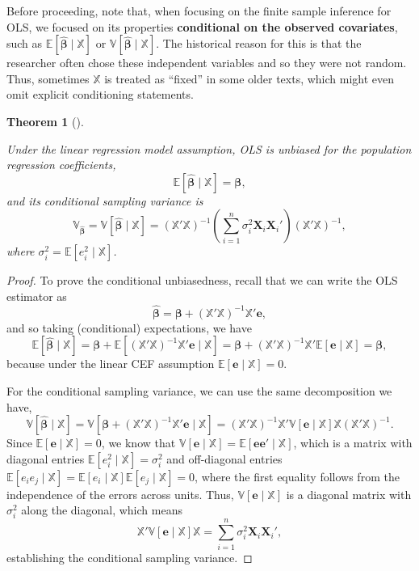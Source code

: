 \documentclass[
  13pt,
  letterpaper,
  DIV=11,
  numbers=noendperiod]{scrreprt}
\newcommand{\mb}{\bm}
\newcommand{\E}{\mathbb{E}}
\newcommand{\V}{\mathbb{V}}
\newcommand{\X}{\mb{X}}
\newcommand{\Xmat}{\mathbb{X}}
\newcommand{\bfbeta}{\mb{\beta}}
\newcommand{\bhat}{\widehat{\mb{\beta}}}
\theoremstyle{plain}
\newtheorem{theorem}{Theorem}[chapter]
\theoremstyle{plain}
\theoremstyle{definition}
\theoremstyle{definition}
\theoremstyle{remark}
\begin{document}
Before proceeding, note that, when focusing on the finite sample
inference for OLS, we focused on its properties \textbf{conditional on
the observed covariates}, such as \(\E[\bhat \mid \Xmat]\) or
\(\V[\bhat \mid \Xmat]\). The historical reason for this is that the
researcher often chose these independent variables and so they were not
random. Thus, sometimes \(\Xmat\) is treated as ``fixed'' in some older
texts, which might even omit explicit conditioning statements.

\begin{theorem}[]\protect\hypertarget{thm-ols-unbiased}{}\label{thm-ols-unbiased}

Under the linear regression model assumption, OLS is unbiased for the
population regression coefficients, \[
\E[\bhat \mid \Xmat] = \bfbeta,
\] and its conditional sampling variance is \[
\mb{\V}_{\bhat} = \V[\bhat \mid \Xmat] = \left( \Xmat'\Xmat \right)^{-1}\left( \sum_{i=1}^n \sigma^2_i \X_i\X_i' \right) \left( \Xmat'\Xmat \right)^{-1},
\] where \(\sigma^2_{i} = \E[e_{i}^{2} \mid \Xmat]\).

\end{theorem}

\begin{proof}
To prove the conditional unbiasedness, recall that we can write the OLS
estimator as \[
\bhat = \bfbeta + (\Xmat'\Xmat)^{-1}\Xmat'\mb{e},
\] and so taking (conditional) expectations, we have \[
\E[\bhat \mid \Xmat] = \bfbeta + \E[(\Xmat'\Xmat)^{-1}\Xmat'\mb{e} \mid \Xmat] = \bfbeta + (\Xmat'\Xmat)^{-1}\Xmat'\E[\mb{e} \mid \Xmat] = \bfbeta,
\] because under the linear CEF assumption \(\E[\mb{e}\mid \Xmat] = 0\).

For the conditional sampling variance, we can use the same decomposition
we have, \[
\V[\bhat \mid \Xmat] = \V[\bfbeta + (\Xmat'\Xmat)^{-1}\Xmat'\mb{e} \mid \Xmat] = (\Xmat'\Xmat)^{-1}\Xmat'\V[\mb{e} \mid \Xmat]\Xmat(\Xmat'\Xmat)^{-1}. 
\] Since \(\E[\mb{e}\mid \Xmat] = 0\), we know that
\(\V[\mb{e}\mid \Xmat] = \E[\mb{ee}' \mid \Xmat]\), which is a matrix
with diagonal entries \(\E[e_{i}^{2} \mid \Xmat] = \sigma^2_i\) and
off-diagonal entries
\(\E[e_{i}e_{j} \mid \Xmat] = \E[e_{i}\mid \Xmat]\E[e_{j}\mid\Xmat] = 0\),
where the first equality follows from the independence of the errors
across units. Thus, \(\V[\mb{e} \mid \Xmat]\) is a diagonal matrix with
\(\sigma^2_i\) along the diagonal, which means \[
\Xmat'\V[\mb{e} \mid \Xmat]\Xmat = \sum_{i=1}^n \sigma^2_i \X_i\X_i',
\] establishing the conditional sampling variance.
\end{proof}
\end{document}
